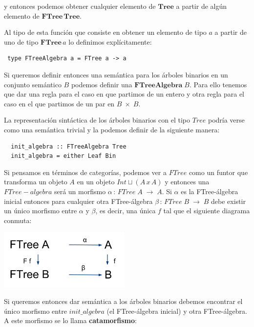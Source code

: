 \documentclass[a4paper,10pt]{article}
\begin{document}
\noindent y entonces podemos obtener cualquier elemento de $\mathbf{Tree}$ a partir de algún elemento de
$\mathbf{FTree\,Tree}$.

Al tipo de esta función que consiste en obtener un elemento de tipo $a$ a partir de uno de tipo
$\mathbf{FTree}\,a$ lo definimos explícitamente:

\begin{lstlisting}
 type FTreeAlgebra a = FTree a -> a
\end{lstlisting}



Si queremos definir entonces una semántica para los árboles binarios en un conjunto
semántico $B$ podemos definir una $\mathbf{FTreeAlgebra}\;B$. Para ello tenemos que dar
una regla para el caso en que partimos de un entero y otra regla para el caso en el que 
partimos de un par en $B\;\times\;B$.

La representación sintáctica de los árboles binarios con el tipo $Tree$ podría verse como una
semántica trivial y la podemos definir de la siguiente manera:

\begin{lstlisting}
  init_algebra :: FTreeAlgebra Tree
  init_algebra = either Leaf Bin
\end{lstlisting}

Si pensamos en términos de categorías, podemos ver a $FTree$ como un funtor que transforma
un objeto $A$ en un objeto $Int \sqcup (A\,x\,A)$ y entonces una $FTree-algebra$ será un morfismo
$\alpha\,:\,FTree\;A\;\rightarrow\;A$. Si $\alpha$ es la FTree-álgebra inicial entonces para cualquier otra
FTree-álgebra $\beta\,:\,FTree\;B\;\rightarrow\;B$ debe existir un único morfismo entre $\alpha$ y $\beta$, 
es decir, una única $f$ tal que el siguiente diagrama conmuta:

\begin{center}
 \includegraphics[height=3cm]{./Falgebras.png}
\end{center}

Si queremos entonces dar semántica a los árboles binarios debemos encontrar el único morfismo
entre $init\_algebra$ (el FTree-álgebra inicial) y otra FTree-álgebra. A este morfismo
se lo llama \textbf{catamorfismo}:
\end{document}
